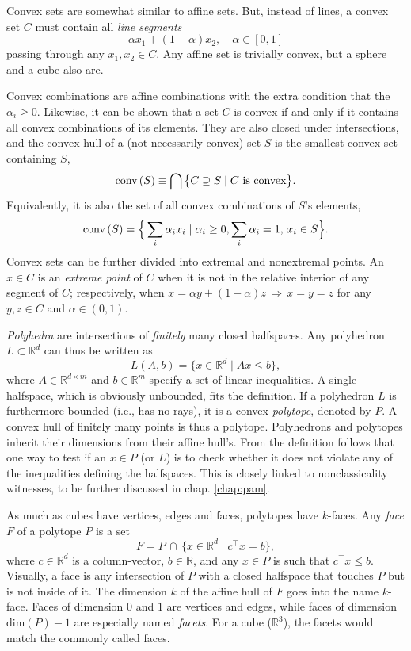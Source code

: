 		Convex sets are somewhat similar to affine sets. But, instead of lines, a convex set $C$ must contain all \emph{line segments}
		$$
			\alpha x_1 + (1 - \alpha) x_2, \quad\alpha \in [0,1]
		$$
		passing through any $x_1, x_2 \in C$. Any affine set is trivially convex, but a sphere and a cube also are.

		Convex combinations are affine combinations with the extra condition that the $\alpha_i \geq 0$. Likewise, it can be shown that a set $C$ is convex if and only if it contains all convex combinations of its elements. They are also closed under intersections, and the convex hull of a (not necessarily convex) set $S$ is the smallest convex set containing $S$,
		$$
			\text{conv} \left( S \right) \equiv \bigcap \big\{ C \supseteq S \mid C \text{ is convex} \big\} .
		$$
		Equivalently, it is also the set of all convex combinations of $S$'s elements,
		$$
			\text{conv} \left( S \right) = \Big\{ \sum_i \alpha_i x_i \mid \alpha_i \geq 0, \sum_i \alpha_i = 1, \, x_i \in S \Big\} .
		$$
		Convex sets can be further divided into extremal and nonextremal points. An $x \in C$ is an \emph{extreme point} of $C$ when it is not in the relative interior of any segment of $C$; respectively, when $x = \alpha y + (1 - \alpha) z \,\Rightarrow\, x=y=z$ for any $y, z \in C$ and $\alpha \in (0, 1)$.

		\emph{Polyhedra} are intersections of \emph{finitely} many closed halfspaces. Any polyhedron $L \subset \mathbb{R}^d$ can thus be written as
		$$
			L(A, b) = \big\{ x \in \mathbb{R}^d \mid Ax \leq b \big\} ,
		$$
		where $A \in \mathbb{R}^{d \times m}$ and $b \in \mathbb{R}^m$ specify a set of linear inequalities. A single halfspace, which is obviously unbounded, fits the definition. If a polyhedron $L$ is furthermore bounded (i.e., has no rays), it is a convex \emph{polytope}, denoted by $P$. A convex hull of finitely many points is thus a polytope. Polyhedrons and polytopes inherit their dimensions from their affine hull's. From the definition follows that one way to test if an $x \in P$ (or $L$) is to check whether it does not violate any of the inequalities defining the halfspaces. This is closely linked to nonclassicality witnesses, to be further discussed in chap. \ref{chap:pam}.

		As much as cubes have vertices, edges and faces, polytopes have $k$-faces. Any \emph{face} $F$ of a polytope $P$ is a set
		$$
			F = P \,\cap\, \{ x \in \mathbb{R}^d \mid c^\intercal x = b \} ,
		$$
		where $c \in \mathbb{R}^d$ is a column-vector, $b \in \mathbb{R}$, and any $x \in P$ is such that $c^\intercal x \leq b$. Visually, a face is any intersection of $P$ with a closed halfspace that touches $P$ but is not inside of it. The dimension $k$ of the affine hull of $F$ goes into the name $k$-face. Faces of dimension $0$ and $1$ are vertices and edges, while faces of dimension $\text{dim} (P) - 1$ are especially named \emph{facets}. For a cube ($\mathbb{R}^3$), the facets would match the commonly called faces.

